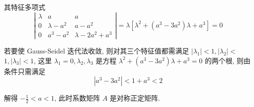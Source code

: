 \begin{tcolorbox}[enhanced,colback=blue!8!white,colframe=blue!25!white,breakable,title=2024]
其特征多项式
$$
\left|\begin{array}{ccc}
\lambda & a & a \\
0 & \lambda-a^{2} & a-a^{2} \\
0 & a^{3}-a^{2} & \lambda-2 a^{2}+a^{3}
\end{array}\right|=\lambda\left[\lambda^{2}+\left(a^{3}-3 a^{2}\right) \lambda+a^{3}\right]=0
$$

若要使 Gauss-Seidel 迭代法收敛, 则对其三个特征值都需满足 $ \left|\lambda_{1}\right|<1,\left|\lambda_{2}\right|< $ $ 1,\left|\lambda_{3}\right|<1 $, 这里 $ \lambda_{1}=0, \lambda_{2}, \lambda_{3} $ 是方程 $ \lambda^{2}+\left(a^{3}-3 a^{2}\right) \lambda+a^{3}=0 $ 的两个根, 则由
条件只需满足
$$
\left|a^{3}-3 a^{2}\right|<1+a^{3}<2
$$

解得 $ -\frac{1}{2}<a<1 $, 此时系数矩阵 $ A $ 是对称正定矩阵.
 \end{tcolorbox}


